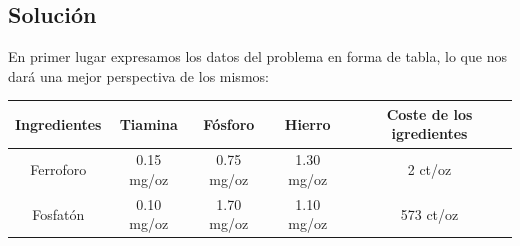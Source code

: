 \documentclass[a4,12pt]{article}
\begin{document}
\subsection{Solución}
En primer lugar expresamos los datos del problema en forma de tabla, lo que nos dará una mejor
perspectiva de los mismos:\\

\begin{center}
\begin{tabular}{|c|c|c|c|c|} \hline
\textbf{Ingredientes}   &  \textbf{Tiamina}  &  \textbf{Fósforo} &  \textbf{Hierro}  &  \textbf{Coste de los igredientes} \\ \hline
Ferroforo  & 0.15 mg/oz  &  0.75 mg/oz & 1.30 mg/oz  &  2 ct/oz  \\  \hline
Fosfatón  & 0.10 mg/oz  &  1.70 mg/oz & 1.10 mg/oz  &  573 ct/oz  \\  \hline
\end{tabular}
\end{center}
\end{document}
